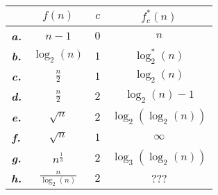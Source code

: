 \noindent\begin{center}\begin{tabular}{c|c c|c}
	& $f(n)$ & $c$ & $f_c^*(n)$ \\ \hline
	\textbf{\textit{a.}} & $n - 1$ & $0$ & $n$ \\
	\textbf{\textit{b.}} & $\log_2(n)$ & $1$ & $\log_2^*(n)$ \\
	\textbf{\textit{c.}} & $\frac{n}{2}$ & $1$ & $\log_2(n)$ \\
	\textbf{\textit{d.}} & $\frac{n}{2}$ & $2$ & $\log_2(n) - 1$ \\
	\textbf{\textit{e.}} & $\sqrt{n}$ & $2$ & $\log_2(\log_2(n))$ \\
	\textbf{\textit{f.}} & $\sqrt{n}$ & $1$ & $\infty$ \\
	\textbf{\textit{g.}} & $n^{\frac{1}{3}}$ & $2$ & $\log_3(\log_2(n))$ \\
	\textbf{\textit{h.}} & $\frac{n}{\log_2(n)}$ & $2$ & ??? \\
\end{tabular}
\end{center}
